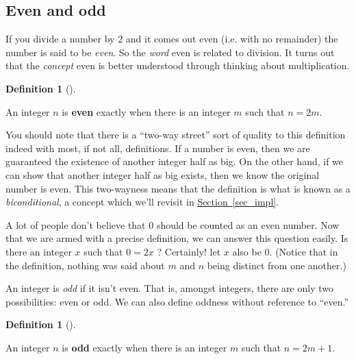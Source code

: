 \documentclass[10pt,]{book}
\newcommand{\terminology}[1]{\textbf{#1}}
\theoremstyle{plain}
\theoremstyle{definition}
\newtheorem{definition}[theorem]{Definition}
\theoremstyle{definition}
\numberwithin{equation}{section}
\begin{document}
\subsection[{Even and odd}]{Even and odd}\label{even_n_odd}

      If you divide a number by 2 and it comes out even (i.e. with
      no remainder) the number is said to be \emph{even}. So the
      \emph{word} even is related to division. It turns out that the
      \emph{concept} even is better understood through thinking about
      multiplication.
\begin{definition}[{}]\label{definition-3}

          An integer \(n\) is \terminology{even} exactly when there is an integer \(m\)
          such that \(n = 2m\).
\end{definition}
\par

      You should note that there is a ``two-way street'' sort of quality
      to this definition \textemdash{} indeed with most, if not all, definitions. If
      a number is even, then we are guaranteed the existence of another
      integer half as big. On the other hand, if we can show that another
      integer half as big exists, then we know the original number is even.
      This two-wayness means that the definition is what is known as a
      \emph{biconditional}, a concept which we'll revisit in
      \hyperref[sec_impl]{Section~\ref{sec_impl}}.
\par

      A lot of people don't believe that \(0\) should be counted as an even
      number. Now that we are armed with a precise definition, we can
      answer this question easily. Is there an integer \(x\) such that
      \(0 = 2x\) ? Certainly! let \(x\) also be \(0\). (Notice that in the
      definition, nothing was said about \(m\) and \(n\) being distinct from
      one another.)
\par

      An integer is \emph{odd} if it isn't even. That is, amongst integers,
      there are only two possibilities: even or odd. We can also define
      oddness without reference to ``even.''
\begin{definition}[{}]\label{definition-4}

          An integer \(n\) is \terminology{odd} exactly when there is an integer \(m\)
          such that \(n = 2m + 1\).
\end{definition}
\typeout{************************************************}
\typeout{************************************************}
\end{document}
